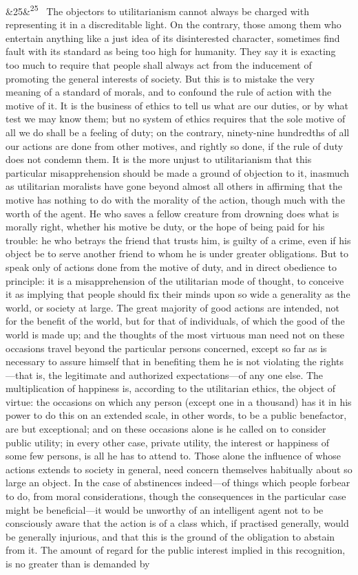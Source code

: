 \documentclass[12pt]{article}
\newcommand{\para}[1][]{\par\noindent\ifx&#1&\else\textsuperscript{\footnotesize #1}~\fi}
\begin{document}
\para[25] The objectors to utilitarianism cannot always be charged with representing it in a discreditable light. On the contrary, those among them who entertain anything like a just idea of its disinterested character, sometimes find fault with its standard as being too high for humanity. They say it is exacting too much to require that people shall always act from the inducement of promoting the general interests of society. But this is to mistake the very meaning of a standard of morals, and to confound the rule of action with the motive of it. It is the business of ethics to tell us what are our duties, or by what test we may know them; but no system of ethics requires that the sole motive of all we do shall be a feeling of duty; on the contrary, ninety-nine hundredths of all our actions are done from other motives, and rightly so done, if the rule of duty does not condemn them. It is the more unjust to utilitarianism that this particular misapprehension should be made a ground of objection to it, inasmuch as utilitarian moralists have gone beyond almost all others in affirming that the motive has nothing to do with the morality of the action, though much with the worth of the agent. He who saves a fellow creature from drowning does what is morally right, whether his motive be duty, or the hope of being paid for his trouble: he who betrays the friend that trusts him, is guilty of a crime, even if his object be to serve another friend to whom he is under greater obligations. But to speak only of actions done from the motive of duty, and in direct obedience to principle: it is a misapprehension of the utilitarian mode of thought, to conceive it as implying that people should fix their minds upon so wide a generality as the world, or society at large. The great majority of good actions are intended, not for the benefit of the world, but for that of individuals, of which the good of the world is made up; and the thoughts of the most virtuous man need not on these occasions travel beyond the particular persons concerned, except so far as is necessary to assure himself that in benefiting them he is not violating the rights---that is, the legitimate and authorized expectations---of any one else. The multiplication of happiness is, according to the utilitarian ethics, the object of virtue: the occasions on which any person (except one in a thousand) has it in his power to do this on an extended scale, in other words, to be a public benefactor, are but exceptional; and on these occasions alone is he called on to consider public utility; in every other case, private utility, the interest or happiness of some few persons, is all he has to attend to. Those alone the influence of whose actions extends to society in general, need concern themselves habitually about so large an object. In the case of abstinences indeed---of things which people forbear to do, from moral considerations, though the consequences in the particular case might be beneficial---it would be unworthy of an intelligent agent not to be consciously aware that the action is of a class which, if practised generally, would be generally injurious, and that this is the ground of the obligation to abstain from it. The amount of regard for the public interest implied in this recognition, is no greater than is demanded by 
\end{document}
